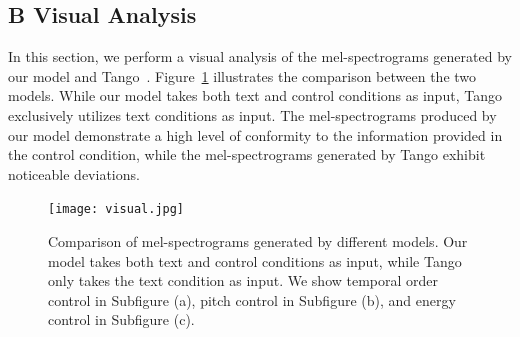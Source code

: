 \documentclass[letterpaper]{article} %
\begin{document}
\subsection{B Visual Analysis}

In this section, we perform a visual analysis of the mel-spectrograms generated by our model and Tango~\cite{choi2018stargan}. Figure~\ref{visual} illustrates the comparison between the two models. While our model takes both text and control conditions as input, Tango exclusively utilizes text conditions as input. The mel-spectrograms produced by our model demonstrate a high level of conformity to the information provided in the control condition, while the mel-spectrograms generated by Tango exhibit noticeable deviations.

\begin{figure}[!t]
    \centering
    \texttt{[image: visual.jpg]}
    \caption{Comparison of mel-spectrograms generated by different models. Our model takes both text and control conditions as input, while Tango only takes the text condition as input. We show temporal order control in Subfigure (a), pitch control in Subfigure (b), and energy control in Subfigure (c).}
    \label{visual}
\end{figure}
\end{document}

